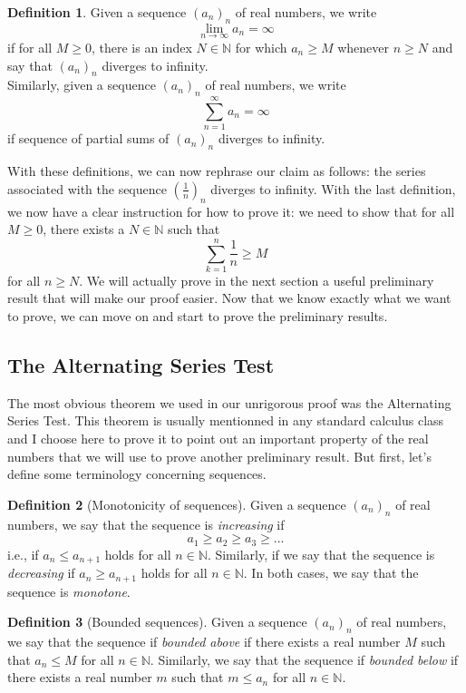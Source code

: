 \documentclass[10pt]{article}
\newcommand{\N}{\mathbb{N}}
\theoremstyle{definition}
\newtheorem*{definition}{Definition}
\begin{document}
\begin{definition}
    Given a sequence $(a_n)_n$ of real numbers, we write
    $$\lim_{n \rightarrow \infty}a_n = \infty$$
    if for all $M \geq 0$, there is an index $N \in \N$ for which $a_n \geq M$ whenever $n \geq N$ and say that $(a_n)_n$ diverges to infinity. \\
    Similarly, given a sequence $(a_n)_n$ of real numbers, we write
    $$\sum_{n=1}^{\infty}a_n = \infty$$
    if sequence of partial sums of $(a_n)_n$ diverges to infinity.\\
\end{definition}

With these definitions, we can now rephrase our claim as follows: the series associated with the sequence $(\frac{1}{n})_n$ diverges to infinity. With the last definition, we now have a clear instruction for how to prove it: we need to show that for all $M \geq 0$, there exists a $N \in \N$ such that
$$\sum_{k=1}^{n}\frac{1}{n} \geq M$$
for all $n \geq N$. We will actually prove in the next section a useful preliminary result that will make our proof easier. Now that we know exactly what we want to prove, we can move on and start to prove the preliminary results.

\subsection{The Alternating Series Test}

The most obvious theorem we used in our unrigorous proof was the Alternating Series Test. This theorem is usually mentionned in any standard calculus class and I choose here to prove it to point out an important property of the real numbers that we will use to prove another preliminary result. But first, let's define some terminology concerning sequences.

\begin{definition}[Monotonicity of sequences]
    Given a sequence $(a_n)_n$ of real numbers, we say that the sequence is \textit{increasing} if
    $$a_1 \geq a_2 \geq a_3 \geq ... $$
    i.e., if $a_n \leq a_{n+1}$ holds for all $n \in \N$. Similarly, if we say that the sequence is \textit{decreasing} if $a_n \geq a_{n+1}$ holds for all $n \in \N$. In both cases, we say that the sequence is \textit{monotone}.
\end{definition}

\begin{definition}[Bounded sequences]
    Given a sequence $(a_n)_n$ of real numbers, we say that the sequence if \textit{bounded above} if there exists a real number $M$ such that $a_n \leq M$ for all $n \in \N$. Similarly, we say that the sequence if \textit{bounded below} if there exists a real number $m$ such that $m \leq a_n$ for all $n \in \N$.
\end{definition}
\end{document}
